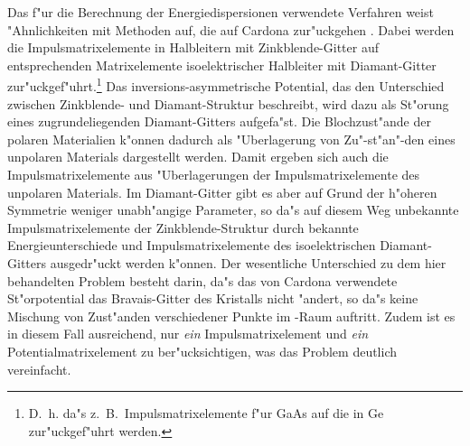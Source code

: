 Das f"ur die Berechnung der Energiedispersionen verwendete Verfahren weist
"Ahnlichkeiten mit Methoden auf, die auf Cardona zur"uckgehen \cite{card:63}.
Dabei werden die Impulsmatrixelemente in Halbleitern mit Zinkblende-Gitter auf
entsprechenden Matrixelemente isoelektrischer Halbleiter mit Diamant-Gitter
zur"uckgef"uhrt.\footnote{D.~h.  da"s z.~B.\ Impulsmatrixelemente f"ur GaAs
  auf die in Ge zur"uckgef"uhrt werden.}  Das inversions-asymmetrische
Potential, das den Unterschied zwischen Zinkblende- und Diamant-Struktur
beschreibt, wird dazu als St"orung eines zugrundeliegenden Diamant-Gitters
aufgefa"st.  Die Blochzust"ande der polaren Materialien k"onnen dadurch als
"Uberlagerung von Zu"-st"an"-den eines unpolaren Materials dargestellt werden.
Damit ergeben sich auch die Impulsmatrixelemente aus "Uberlagerungen der
Impulsmatrixelemente des unpolaren Materials. Im Diamant-Gitter gibt es aber
auf Grund der h"oheren Symmetrie weniger unabh"angige Parameter, so da"s auf
diesem Weg unbekannte Impulsmatrixelemente der Zinkblende-Struktur durch
bekannte Energieunterschiede und Impulsmatrixelemente des isoelektrischen
Diamant-Gitters ausgedr"uckt werden k"onnen. Der wesentliche Unterschied zu
dem hier behandelten Problem besteht darin, da"s das von Cardona verwendete
St"orpotential das Bravais-Gitter des Kristalls nicht "andert, so da"s keine
Mischung von Zust"anden verschiedener Punkte im -Raum auftritt. 
Zudem ist es in diesem Fall ausreichend, nur \emph{ein} Impulsmatrixelement und
\emph{ein} Potentialmatrixelement zu ber"ucksichtigen, was das Problem
deutlich vereinfacht.




